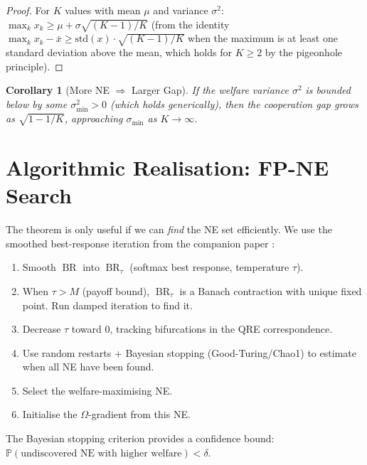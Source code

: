 \documentclass[11pt,a4paper]{article}
\newtheorem{corollary}[theorem]{Corollary}
\DeclareMathOperator{\BR}{BR}
\newcommand{\Prob}{\mathbb{P}}
\begin{document}
\begin{proof}
For $K$ values with mean $\mu$ and variance $\sigma^2$:
$\max_k x_k \geq \mu + \sigma\sqrt{(K-1)/K}$ (from the identity
$\max_k x_k - \bar{x} \geq \text{std}(x) \cdot \sqrt{(K-1)/K}$
when the maximum is at least one standard deviation above the mean,
which holds for $K \geq 2$ by the pigeonhole principle).
\end{proof}

\begin{corollary}[More NE $\Rightarrow$ Larger Gap]
If the welfare variance $\sigma^2$ is bounded below by some
$\sigma_{\min}^2 > 0$ (which holds generically), then the cooperation
gap grows as $\sqrt{1 - 1/K}$, approaching $\sigma_{\min}$ as
$K \to \infty$.
\end{corollary}


\section{Algorithmic Realisation: FP-NE Search}
\label{sec:algorithm}

The theorem is only useful if we can \emph{find} the NE set efficiently.
We use the smoothed best-response iteration from the companion paper
\cite{shcherbinin2026fpne}:

\begin{enumerate}
    \item Smooth $\BR$ into $\BR_\tau$ (softmax best response, temperature $\tau$).
    \item When $\tau > M$ (payoff bound), $\BR_\tau$ is a Banach contraction
    with unique fixed point. Run damped iteration to find it.
    \item Decrease $\tau$ toward 0, tracking bifurcations in the QRE
    correspondence.
    \item Use random restarts + Bayesian stopping (Good-Turing/Chao1)
    to estimate when all NE have been found.
    \item Select the welfare-maximising NE.
    \item Initialise the $\Omega$-gradient from this NE.
\end{enumerate}

The Bayesian stopping criterion provides a confidence bound:
$\Prob(\text{undiscovered NE with higher welfare}) < \delta$.


\end{document}
